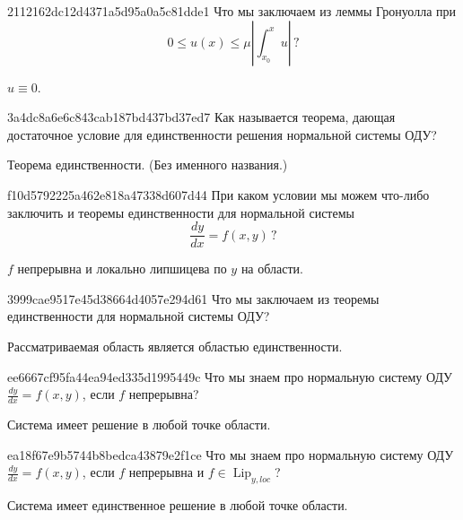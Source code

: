 \begin{note}{2112162dc12d4371a5d95a0a5c81dde1}
    Что мы заключаем из леммы Гронуолла при
    \[
        0 \leqslant u(x) \leqslant \mu \left\lvert \int_{x_0}^{x} u \right\rvert\,?
    \]

    \begin{cloze}{1}
        \({ u \equiv 0 }\).
    \end{cloze}
\end{note}

\begin{note}{3a4dc8a6e6c843cab187bd437bd37ed7}
    Как называется теорема, дающая достаточное условие для единственности решения нормальной системы ОДУ?

    \begin{cloze}{1}
        Теорема единственности. (Без именного названия.)
    \end{cloze}
\end{note}

\begin{note}{f10d5792225a462e818a47338d607d44}
    При каком условии мы можем что-либо заключить и теоремы единственности для нормальной системы
    \[
        \frac{dy}{dx} = f(x, y)\,?
    \]

    \begin{cloze}{1}
        \({ f }\) непрерывна и локально липшицева по \({ y }\) на области.
    \end{cloze}
\end{note}

\begin{note}{3999cae9517e45d38664d4057e294d61}
    Что мы заключаем из теоремы единственности для нормальной системы ОДУ?

    \begin{cloze}{1}
        Рассматриваемая область является областью единственности.
    \end{cloze}
\end{note}

\begin{note}{ee6667cf95fa44ea94ed335d1995449c}
    Что мы знаем про нормальную систему ОДУ \({ \frac{dy}{dx} = f(x, y) }\), если \({ f }\) непрерывна?

    \begin{cloze}{1}
        Система имеет решение в любой точке области.
    \end{cloze}
\end{note}

\begin{note}{ea18f67e9b5744b8bedca43879e2f1ce}
    Что мы знаем про нормальную систему ОДУ \({ \frac{dy}{dx} = f(x, y) }\), если \({ f }\) непрерывна и \({ f \in \operatorname{Lip}_{y,loc} }\)?

    \begin{cloze}{1}
        Система имеет единственное решение в любой точке области.
    \end{cloze}
\end{note}

